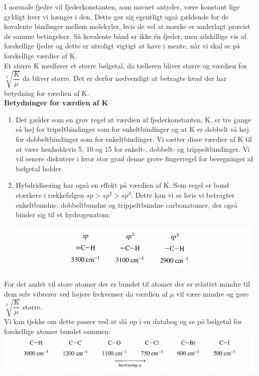 I normale fjedre vil fjederkonstanten, som navnet antyder, være konstant lige gyldigt hver vi hænger i den. Dette gør sig egentligt også gældende for de kovalente bindinger mellem molekyler, hvis de vel at mærke er underlagt præcist de samme betingelser. Så kovalente bånd er ikke én fjeder, men adskillige vis af forskellige fjedre og dette er utroligt vigtigt at have i mente, når vi skal se på forskellige værdier af K.
\\
Et større K medfører et større bølgetal, da tælleren bliver større og værdien for $\sqrt[2]{\dfrac{K}{\mu}}$ da bliver større. Det er derfor nødvendigt at betragte hvad der har betydning for værdien af K. 
\\
\textbf{Betydninger for værdien af K}
\begin{enumerate}
\item Det gælder som en grov regel at værdien af fjederkonstanten, K, er tre gange så høj for tripeltbindinger som for enkeltbindinger og at K er dobbelt så høj for dobbeltbindinger som for enkeltbindinger. Vi sætter disse værdier af K til at være henholdsvis 5, 10 og 15 for enkelt-, dobbelt- og trippeltbindinger. Vi vil senere diskutere i hvor stor grad denne grove fingerregel for beregninger af bølgetal holder.

\item Hybdridisering har også en effekt på værdien af K. Som regel er bond stærkere i rækkefølgen $sp > sp^2 > sp^3$. Dette kan vi se hvis vi betragter enkeltbundne, dobbeltbundne og trippeltbundne carbonatomer, der også binder sig til et hydrogenatom:

\begin{center}
\includegraphics[scale=1]{Billeder/sp}
\end{center}


\end{enumerate}

For det andet vil store atomer der er bundet til atomer der er relativt mindre til dem selv vibrerer ved højere frekvenser da værdien af $\mu$ vil være mindre og gøre $\sqrt[2]{\dfrac{K}{\mu}}$ større. 
\\
Vi kan tjekke om dette passer ved at slå op i en databog og se på bølgetal for forskellige atomer bundet sammen:
\\
\includegraphics[scale=1]{Billeder/udklip}

